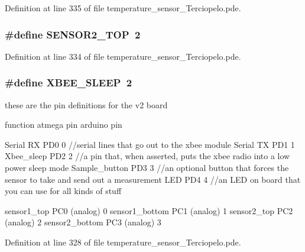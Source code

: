 Definition at line 335 of file temperature\_\-sensor\_\-Terciopelo.pde.\hypertarget{applet_2temperature__sensor___terciopelo_8pde_645141ae2ab7fa7ac3f690c4959b6baf}{
\subsubsection[{SENSOR2\_\-TOP}]{\setlength{\rightskip}{0pt plus 5cm}\#define SENSOR2\_\-TOP~2}}
\label{applet_2temperature__sensor___terciopelo_8pde_645141ae2ab7fa7ac3f690c4959b6baf}




Definition at line 334 of file temperature\_\-sensor\_\-Terciopelo.pde.\hypertarget{applet_2temperature__sensor___terciopelo_8pde_658c2878485cfe5cc625d283a6d34bc1}{
\subsubsection[{XBEE\_\-SLEEP}]{\setlength{\rightskip}{0pt plus 5cm}\#define XBEE\_\-SLEEP~2}}
\label{applet_2temperature__sensor___terciopelo_8pde_658c2878485cfe5cc625d283a6d34bc1}


these are the pin definitions for the v2 board

function atmega pin arduino pin

Serial RX PD0 0 //serial lines that go out to the xbee module Serial TX PD1 1 Xbee\_\-sleep PD2 2 //a pin that, when asserted, puts the xbee radio into a low power sleep mode Sample\_\-button PD3 3 //an optional button that forces the sensor to take and send out a measurement LED PD4 4 //an LED on board that you can use for all kinds of stuff

sensor1\_\-top PC0 (analog) 0 sensor1\_\-bottom PC1 (analog) 1 sensor2\_\-top PC2 (analog) 2 sensor2\_\-bottom PC3 (analog) 3 

Definition at line 328 of file temperature\_\-sensor\_\-Terciopelo.pde.

